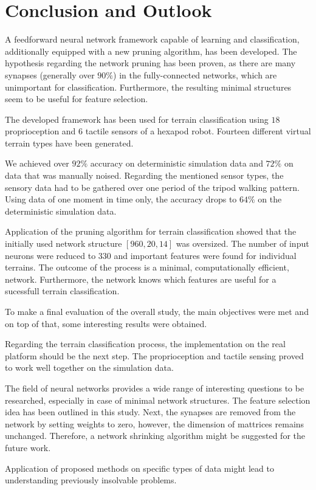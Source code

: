 \chapter{Conclusion and Outlook} \label{chap:conclusion}
A feedforward neural network framework capable of learning and classification, additionally equipped with a new pruning algorithm, has been developed. The hypothesis regarding the network pruning has been proven, as there are many synapses (generally over $ 90\% $) in the fully-connected networks, which are unimportant for classification. Furthermore, the resulting minimal structures seem to be useful for feature selection.

The developed framework has been used for terrain classification using $ 18 $ proprioception and $ 6 $ tactile sensors of a hexapod robot. Fourteen different virtual terrain types have been generated. 

We achieved over $ 92\% $ accuracy on deterministic simulation data and $ 72\% $ on data that was manually noised. Regarding the mentioned sensor types, the sensory data had to be gathered over one period of the tripod walking pattern. Using data of one moment in time only, the accuracy drops to $ 64\% $ on the deterministic simulation data.

Application of the pruning algorithm for terrain classification showed that the initially used network structure $ [960, 20, 14] $ was oversized. The number of input neurons were reduced to $ 330 $ and important features were found for individual terrains. The outcome of the process is a minimal, computationally efficient, network. Furthermore, the network knows which features are useful for a sucessfull terrain classification. 

To make a final evaluation of the overall study, the main objectives were met and on top of that, some interesting results were obtained. 

Regarding the terrain classification process, the implementation on the real platform should be the next step. The proprioception and tactile sensing proved to work well together on the simulation data.

The field of neural networks provides a wide range of interesting questions to be researched, especially in case of minimal network structures. The feature selection idea has been outlined in this study. Next, the synapses are removed from the network by setting weights to zero, however, the dimension of mattrices remains unchanged. Therefore, a network shrinking algorithm might be suggested for the future work.

Application of proposed methods on specific types of data might lead to understanding previously insolvable problems.